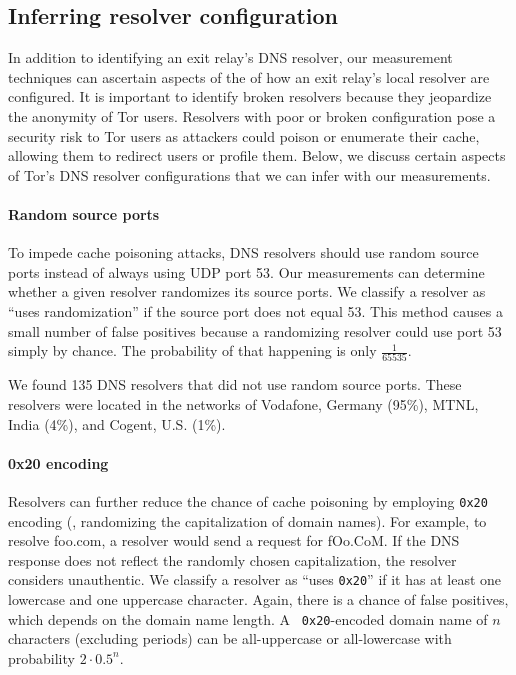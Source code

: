 
\iffalse
\subsection{Inferring resolver configuration}
\label{sec:mapping-configuration}

In addition to identifying an exit relay's DNS resolver, our measurement
techniques can ascertain aspects of the of how an exit relay's local
resolver are configured.  It is important to identify broken resolvers
because they jeopardize the anonymity of Tor users.  Resolvers with poor
or broken configuration pose a security risk to Tor users as attackers
could poison or enumerate their cache, allowing them to redirect users
or profile them. Below, we discuss certain aspects of Tor's DNS resolver
configurations that we can infer with our measurements.

\paragraph{Random source ports}
To impede cache poisoning attacks, DNS resolvers should use random
source ports instead of always using UDP port 53.  Our measurements can
determine whether a given resolver randomizes its source ports.  We
classify a resolver as ``uses randomization'' if the source port does
not equal 53.  This method causes a small number of false positives
because a randomizing resolver could use port 53 simply by chance.  The
probability of that happening is only $\frac{1}{65535}$.

We found 135 DNS resolvers that did not use random source ports.  These
resolvers were located in the networks of Vodafone, Germany (95\%), MTNL, India
(4\%), and Cogent, U.S. (1\%).

\paragraph{0x20 encoding}
Resolvers can further reduce the chance of cache poisoning by employing
{\tt 0x20} encoding (\ie, randomizing the capitalization of domain
names).  For example, to resolve foo.com, a resolver would send a
request for fOo.CoM.  If the DNS response does not reflect the
randomly chosen capitalization, the resolver considers unauthentic.  We
classify a resolver as ``uses {\tt 0x20}'' if it has at least one
lowercase and one uppercase character.  Again, there is a chance of
false positives, which depends on the domain name length.  A {\tt
  0x20}-encoded domain name of $n$ characters (excluding periods) can be
all-uppercase or all-lowercase with probability $2 \cdot 0.5^n$.

